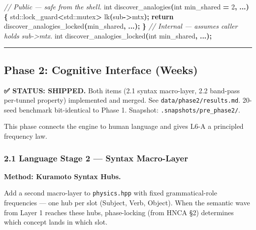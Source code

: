 \documentclass[
  11pt,
  a4paper,
]{article}
\newenvironment{Shaded}{\begin{snugshade}}{\end{snugshade}}
\newcommand{\BuiltInTok}[1]{#1}
\newcommand{\CommentTok}[1]{\textcolor[rgb]{0.56,0.35,0.01}{\textit{#1}}}
\newcommand{\ControlFlowTok}[1]{\textcolor[rgb]{0.13,0.29,0.53}{\textbf{#1}}}
\newcommand{\DataTypeTok}[1]{\textcolor[rgb]{0.13,0.29,0.53}{#1}}
\newcommand{\DecValTok}[1]{\textcolor[rgb]{0.00,0.00,0.81}{#1}}
\newcommand{\NormalTok}[1]{#1}
\newcommand{\OperatorTok}[1]{\textcolor[rgb]{0.81,0.36,0.00}{\textbf{#1}}}
\begin{document}
\begin{Shaded}
\begin{Highlighting}[]
\CommentTok{// Public — safe from the shell.}
\DataTypeTok{int}\NormalTok{ discover\_analogies}\OperatorTok{(}\DataTypeTok{int}\NormalTok{ min\_shared }\OperatorTok{=} \DecValTok{2}\OperatorTok{,} \OperatorTok{...)} \OperatorTok{\{}
    \BuiltInTok{std::}\NormalTok{lock\_guard}\OperatorTok{\textless{}}\BuiltInTok{std::}\NormalTok{mutex}\OperatorTok{\textgreater{}}\NormalTok{ lk}\OperatorTok{(}\NormalTok{sub}\OperatorTok{{-}\textgreater{}}\NormalTok{mtx}\OperatorTok{);}
    \ControlFlowTok{return}\NormalTok{ discover\_analogies\_locked}\OperatorTok{(}\NormalTok{min\_shared}\OperatorTok{,} \OperatorTok{...);}
\OperatorTok{\}}
\CommentTok{// Internal — assumes caller holds sub{-}\textgreater{}mtx.}
\DataTypeTok{int}\NormalTok{ discover\_analogies\_locked}\OperatorTok{(}\DataTypeTok{int}\NormalTok{ min\_shared}\OperatorTok{,} \OperatorTok{...);}
\end{Highlighting}
\end{Shaded}

\begin{center}\rule{0.5\linewidth}{0.5pt}\end{center}

\subsection{Phase 2: Cognitive Interface
(Weeks)}\label{phase-2-cognitive-interface-weeks}

\textbf{✅ STATUS: SHIPPED.} Both items (2.1 syntax macro-layer, 2.2
band-pass per-tunnel property) implemented and merged. See
\texttt{data/phase2/results.md}. 20-seed benchmark bit-identical to
Phase 1. Snapshot: \texttt{.snapshots/pre\_phase2/}.

This phase connects the engine to human language and gives L6-A a
principled frequency law.

\subsubsection{2.1 Language Stage 2 --- Syntax
Macro-Layer}\label{language-stage-2-syntax-macro-layer}

\textbf{Method: Kuramoto Syntax Hubs.}

Add a second macro-layer to \texttt{physics.hpp} with fixed
grammatical-role frequencies --- one hub per slot (Subject, Verb,
Object). When the semantic wave from Layer 1 reaches these hubs,
phase-locking (from HNCA §2) determines which concept lands in which
slot.
\end{document}
